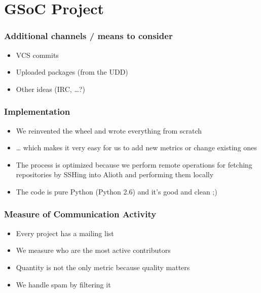 \documentclass[compress]{beamer}
\begin{document}
\section{GSoC Project}

\begin{frame}
  \frametitle{Additional channels / means %
              to consider
             }
  \begin{itemize}
    \item VCS commits
    \item Uploaded packages (from the UDD)
    \item Other ideas (IRC, \dots?)
  \end{itemize}
\end{frame}

\begin{frame}
    \frametitle{Implementation}
    \begin{itemize}
        \item We reinvented the wheel and wrote everything from scratch 
        \item \dots{} which makes it very easy for us to add new metrics or change existing ones
        \pause
        \item The process is optimized because we perform remote operations for fetching repositories by SSHing into Alioth and performing them locally
        \pause
        \item The code is pure Python (Python 2.6) and it's good and clean ;)
    \end{itemize}
\end{frame}

\begin{frame}
  \frametitle{Measure of Communication Activity}
  \begin{itemize}
     \item Every project has a mailing list
     \item We measure who are the most active contributors
     \item Quantity is not the only metric because quality matters 
     \item We handle spam by filtering it
  \end{itemize}
\end{frame}
\end{document}
